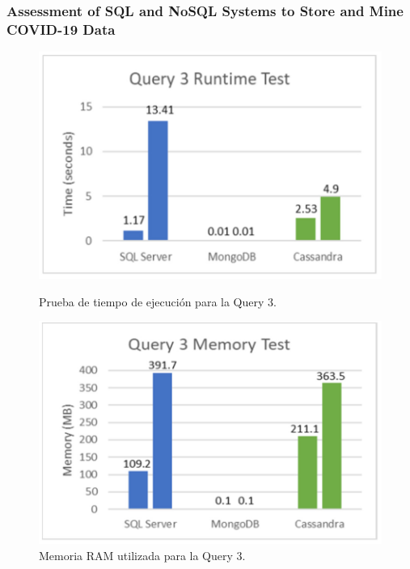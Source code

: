 \begin{frame}
    \frametitle{Assessment of SQL and NoSQL Systems to Store and Mine COVID-19 Data}

    \begin{figure}[H]
        \centering
        \begin{minipage}[b]{0.48\textwidth}
            \centering
            \includegraphics[width=\textwidth]{images/cov19-runt-test-q3.png}
            \caption{Prueba de tiempo de ejecución para la Query 3.}
            \label{cov19-runtest-q3}
        \end{minipage}
        \hfill
        \begin{minipage}[b]{0.48\textwidth}
            \centering
            \includegraphics[width=\textwidth]{images/cov19-mem-test-q3.png}
            \caption{Memoria RAM utilizada para la Query 3.}
            \label{cov19-memtest-q3}
        \end{minipage}
    \end{figure}
\end{frame}

